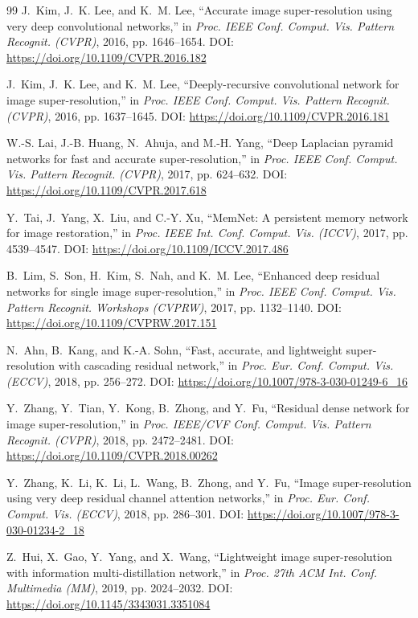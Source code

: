 \documentclass[10pt,onecolumn,journal]{IEEEtran}
\begin{document}
\begin{thebibliography}{99}
J.~Kim, J.~K. Lee, and K.~M. Lee, ``Accurate image super-resolution using very deep convolutional networks,'' in \emph{Proc. IEEE Conf. Comput. Vis. Pattern Recognit. (CVPR)}, 2016, pp. 1646--1654. DOI: \url{https://doi.org/10.1109/CVPR.2016.182}

J.~Kim, J.~K. Lee, and K.~M. Lee, ``Deeply-recursive convolutional network for image super-resolution,'' in \emph{Proc. IEEE Conf. Comput. Vis. Pattern Recognit. (CVPR)}, 2016, pp. 1637--1645. DOI: \url{https://doi.org/10.1109/CVPR.2016.181}

W.-S. Lai, J.-B. Huang, N.~Ahuja, and M.-H. Yang, ``Deep Laplacian pyramid networks for fast and accurate super-resolution,'' in \emph{Proc. IEEE Conf. Comput. Vis. Pattern Recognit. (CVPR)}, 2017, pp. 624--632. DOI: \url{https://doi.org/10.1109/CVPR.2017.618}

Y.~Tai, J.~Yang, X.~Liu, and C.-Y. Xu, ``MemNet: A persistent memory network for image restoration,'' in \emph{Proc. IEEE Int. Conf. Comput. Vis. (ICCV)}, 2017, pp. 4539--4547. DOI: \url{https://doi.org/10.1109/ICCV.2017.486}

B.~Lim, S.~Son, H.~Kim, S.~Nah, and K.~M. Lee, ``Enhanced deep residual networks for single image super-resolution,'' in \emph{Proc. IEEE Conf. Comput. Vis. Pattern Recognit. Workshops (CVPRW)}, 2017, pp. 1132--1140. DOI: \url{https://doi.org/10.1109/CVPRW.2017.151}

N.~Ahn, B.~Kang, and K.-A. Sohn, ``Fast, accurate, and lightweight super-resolution with cascading residual network,'' in \emph{Proc. Eur. Conf. Comput. Vis. (ECCV)}, 2018, pp. 256--272. DOI: \url{https://doi.org/10.1007/978-3-030-01249-6_16}

Y.~Zhang, Y.~Tian, Y.~Kong, B.~Zhong, and Y.~Fu, ``Residual dense network for image super-resolution,'' in \emph{Proc. IEEE/CVF Conf. Comput. Vis. Pattern Recognit. (CVPR)}, 2018, pp. 2472--2481. DOI: \url{https://doi.org/10.1109/CVPR.2018.00262}

Y.~Zhang, K.~Li, K.~Li, L.~Wang, B.~Zhong, and Y.~Fu, ``Image super-resolution using very deep residual channel attention networks,'' in \emph{Proc. Eur. Conf. Comput. Vis. (ECCV)}, 2018, pp. 286--301. DOI: \url{https://doi.org/10.1007/978-3-030-01234-2_18}

Z.~Hui, X.~Gao, Y.~Yang, and X.~Wang, ``Lightweight image super-resolution with information multi-distillation network,'' in \emph{Proc. 27th ACM Int. Conf. Multimedia (MM)}, 2019, pp. 2024--2032. DOI: \url{https://doi.org/10.1145/3343031.3351084}


\end{thebibliography}
\end{document}
